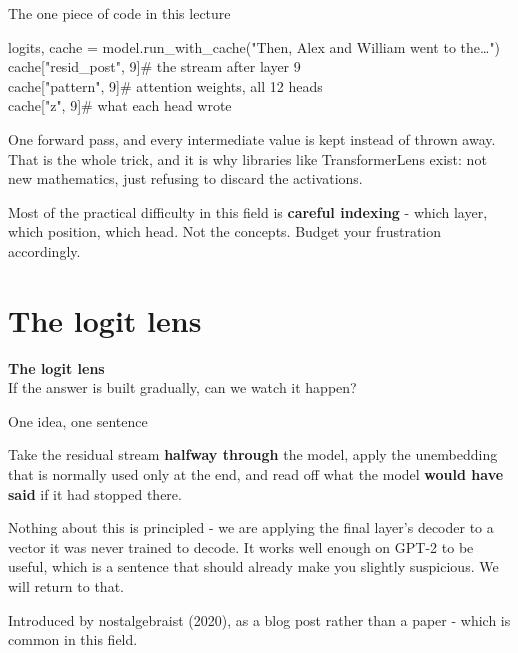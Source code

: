 \documentclass[aspectratio=169]{beamer}
\newcommand{\keybox}[1]{%
  \begin{tcolorbox}[colback=armblue!8, colframe=armblue, boxrule=0.6pt, arc=2pt]
  #1
  \end{tcolorbox}}
\newcommand{\watchbox}[1]{%
  \begin{tcolorbox}[colback=armorange!12, colframe=armorange, boxrule=0.6pt, arc=2pt]
  #1
  \end{tcolorbox}}
\newcommand{\codebox}[1]{%
  \begin{center}
  \begin{tcolorbox}[colback=lightbg, colframe=gray, boxrule=0.5pt, arc=2pt,
                    width=0.94\textwidth, left=4pt, right=4pt, top=3pt, bottom=3pt]
    \ttfamily\scriptsize #1
  \end{tcolorbox}
  \end{center}}
\newcommand{\sectiontransition}[2]{%
  \begin{frame}[plain]
    \vfill
    \begin{center}
      {\Huge\bfseries\color{popblue} #1}\\[1.1em]
      {\large #2}
    \end{center}
    \vfill
  \end{frame}}
\begin{document}
\begin{frame}{The one piece of code in this lecture}
  \vspace{0.6em}
  \codebox{%
    logits, cache = model.run\_with\_cache("Then, Alex and William went to the\ldots")\\[0.4em]
    cache["resid\_post", 9]\hspace{2.6em}\# the stream after layer 9\\
    cache["pattern", 9]\hspace{3.9em}\# attention weights, all 12 heads\\
    cache["z", 9]\hspace{5.5em}\# what each head wrote
  }

  \vspace{0.5em}
  One forward pass, and every intermediate value is kept instead of thrown away. That is the
  whole trick, and it is why libraries like TransformerLens exist: not new mathematics, just
  refusing to discard the activations.

  \vspace{0.8em}
  \watchbox{Most of the practical difficulty in this field is \textbf{careful indexing} - which
  layer, which position, which head. Not the concepts. Budget your frustration accordingly.}
\end{frame}

\section{The logit lens}
\sectiontransition{The logit lens}{If the answer is built gradually, can we watch it happen?}

\begin{frame}{One idea, one sentence}
  \vspace{0.9em}
  \keybox{Take the residual stream \textbf{halfway through} the model, apply the unembedding
  that is normally used only at the end, and read off what the model \textbf{would have said}
  if it had stopped there.}

  \vspace{0.9em}
  Nothing about this is principled - we are applying the final layer's decoder to a vector it
  was never trained to decode. It works well enough on GPT-2 to be useful, which is a sentence
  that should already make you slightly suspicious. We will return to that.

  \vspace{0.7em}
  {\footnotesize Introduced by nostalgebraist (2020), as a blog post rather than a paper - which
  is common in this field.}
\end{frame}
\end{document}
